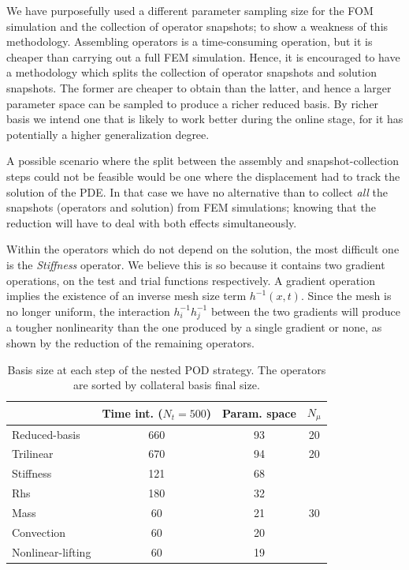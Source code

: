 \documentclass[../../thesis.tex]{subfiles}
\begin{document}
We have purposefully used a different parameter sampling size 
for the FOM simulation and the collection of operator snapshots;
to show a weakness of this methodology.
Assembling operators is a time-consuming operation, 
but it is cheaper than carrying out a full FEM simulation.
Hence, it is encouraged to have a methodology which splits the collection
of operator snapshots and solution snapshots.
The former are cheaper to obtain than the latter, 
and hence a larger parameter space can be sampled to produce a richer reduced basis.
By richer basis we intend one that is likely to work better during the online stage, 
for it has potentially a higher generalization degree.

A possible scenario where the split between the assembly and snapshot-collection steps
could not be feasible would be one where the displacement had to track the solution of the PDE.
In that case we have no alternative than to collect 
\textit{all} the snapshots (operators and solution) from FEM simulations;
knowing that the reduction will have to deal with both effects simultaneously. 

Within the operators which do not depend on the solution,
the most difficult one is the \textit{Stiffness} operator. 
We believe this is so because it contains two gradient operations,
on the test and trial functions respectively.
A gradient operation implies the existence of an inverse mesh size term \mbox{$h^{-1}(x,t)$}.
Since the mesh is no longer uniform, 
the interaction \mbox{$h_{i}^{-1} h_{j}^{-1}$} between the two gradients will produce a tougher nonlinearity
than the one produced by a single gradient or none, 
as shown by the reduction of the remaining operators.

\begin{table}[h]
    \centering
    \caption{Basis size at each step of the nested POD strategy.
    The operators are sorted by collateral basis final size.}
    \begin{tabular}{lccc}
        \toprule
        {} &  Time int. ($N_t = 500$) &  Param. space & $N_{\mu}$ \\
        \midrule
        Reduced-basis     &                     660 &          93 & 20 \\
        \midrule[0.01mm]
        Trilinear         &                     670 &          94 & 20 \\
        Stiffness         &                     121 &          68 & \multirow{5}{*}{30} \\
        Rhs               &                     180 &          32 &  \\
        Mass              &                      60 &          21 &  \\
        Convection        &                      60 &          20 &  \\
        Nonlinear-lifting &                      60 &          19 &  \\
        \bottomrule
    \end{tabular}        
    \label{tab:nlinear_disp_bases_size}
\end{table}
\end{document}
